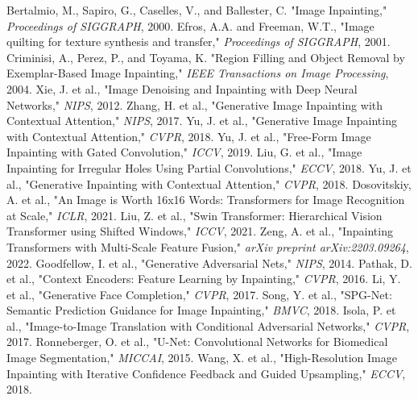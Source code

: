\documentclass[sigconf]{acmart}
\begin{document}
\begin{thebibliography}{99}
     Bertalmio, M., Sapiro, G., Caselles, V., and Ballester, C. "Image Inpainting," \textit{Proceedings of SIGGRAPH}, 2000.
     Efros, A.A. and Freeman, W.T., "Image quilting for texture synthesis and transfer," \textit{Proceedings of SIGGRAPH}, 2001.
     Criminisi, A., Perez, P., and Toyama, K. "Region Filling and Object Removal by Exemplar-Based Image Inpainting," \textit{IEEE Transactions on Image Processing}, 2004.
     Xie, J. et al., "Image Denoising and Inpainting with Deep Neural Networks," \textit{NIPS}, 2012.
     Zhang, H. et al., "Generative Image Inpainting with Contextual Attention," \textit{NIPS}, 2017.
     Yu, J. et al., "Generative Image Inpainting with Contextual Attention," \textit{CVPR}, 2018.
     Yu, J. et al., "Free-Form Image Inpainting with Gated Convolution," \textit{ICCV}, 2019.
     Liu, G. et al., "Image Inpainting for Irregular Holes Using Partial Convolutions," \textit{ECCV}, 2018.
     Yu, J. et al., "Generative Inpainting with Contextual Attention," \textit{CVPR}, 2018.
     Dosovitskiy, A. et al., "An Image is Worth 16x16 Words: Transformers for Image Recognition at Scale," \textit{ICLR}, 2021.
     Liu, Z. et al., "Swin Transformer: Hierarchical Vision Transformer using Shifted Windows," \textit{ICCV}, 2021.
     Zeng, A. et al., "Inpainting Transformers with Multi-Scale Feature Fusion," \textit{arXiv preprint arXiv:2203.09264}, 2022.
     Goodfellow, I. et al., "Generative Adversarial Nets," \textit{NIPS}, 2014.
     Pathak, D. et al., "Context Encoders: Feature Learning by Inpainting," \textit{CVPR}, 2016.
     Li, Y. et al., "Generative Face Completion," \textit{CVPR}, 2017.
     Song, Y. et al., "SPG-Net: Semantic Prediction Guidance for Image Inpainting," \textit{BMVC}, 2018.
     Isola, P. et al., "Image-to-Image Translation with Conditional Adversarial Networks," \textit{CVPR}, 2017.
     Ronneberger, O. et al., "U-Net: Convolutional Networks for Biomedical Image Segmentation," \textit{MICCAI}, 2015.
     Wang, X. et al., "High-Resolution Image Inpainting with Iterative Confidence Feedback and Guided Upsampling," \textit{ECCV}, 2018.

\end{thebibliography}
\end{document}
